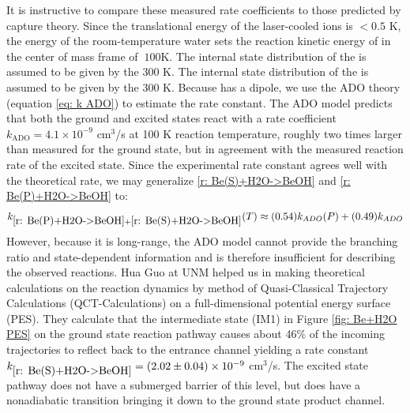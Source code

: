It is instructive to compare these measured rate coefficients to those predicted by capture theory. Since the translational energy of the laser-cooled  ions is $<0.5$ K, the energy of the room-temperature water sets the reaction kinetic energy of  in the center of mass frame of $~100$K. The internal state distribution of the  is assumed to be given by the 300 K. The internal state distribution of the  is assumed to be given by the 300 K. Because  has a dipole, we use the ADO theory (equation \ref{eq: k ADO}) to estimate the rate constant. The ADO model predicts that both the ground and excited  states react with a rate coefficient $k_{\text{ADO}} = 4.1 \times 10^{-9}$ cm$^3$/s at 100 K reaction temperature, roughly two times larger than measured for the ground state, but in agreement with the measured reaction rate of the excited state. Since the experimental rate constant agrees well with the theoretical rate, we may generalize \ref{r: Be(S)+H2O->BeOH} and \ref{r: Be(P)+H2O->BeOH} to:
\begin{equation}
	k_{\ref{r: Be(P)+H2O->BeOH}+\ref{r: Be(S)+H2O->BeOH}}(T) \approx (0.54)k_{ADO}(P) + (0.49)k_{ADO}
	\label{eq: k Be+H2O(T)}
\end{equation}
However, because it is long-range, the ADO model cannot provide the branching ratio and state-dependent information and is therefore insufficient for describing the observed reactions. Hua Guo at UNM helped us in making theoretical calculations on the reaction dynamics by method of Quasi-Classical Trajectory Calculations (QCT-Calculations) on a full-dimensional potential energy surface (PES).\cite{Yang2018} They calculate that the intermediate state (IM1) in Figure \ref{fig: Be+H2O PES} on the ground state reaction pathway causes about 46\% of the incoming trajectories to reflect back to the entrance channel yielding a rate constant $k_{\ref{r: Be(S)+H2O->BeOH}} = (2.02 \pm 0.04) \times 10^{-9}$ cm$^3$/s. The excited state pathway does not have a submerged barrier of this level, but does have a nonadiabatic transition bringing it down to the ground state product channel.

